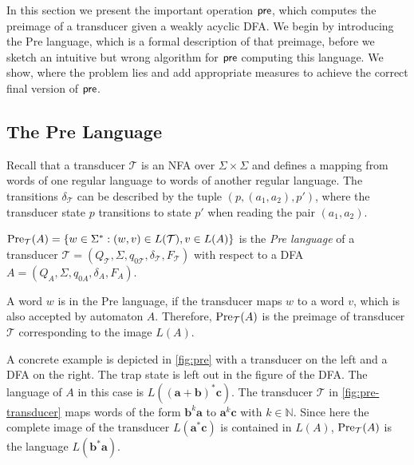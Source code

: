 In this section we present the important operation $\operatorname{\textsf{pre}}$, which computes the preimage of a transducer given a weakly acyclic DFA. We begin by introducing the Pre language, which is a formal description of that preimage, before we sketch an intuitive but wrong algorithm for $\operatorname{\textsf{pre}}$ computing this language. We show, where the problem lies and add appropriate measures to achieve the correct final version of $\operatorname{\textsf{pre}}$.

\subsection{The Pre Language}\label{sec:pre_theory}
Recall that a transducer $\mathcal{T}$ is an NFA over $\Sigma \times \Sigma$ and defines a mapping from words of one regular language to words of another regular language. The transitions $\delta_{\mathcal{T}}$ can be described by the tuple $(p,(a_{1},a_{2}),p')$, where the transducer state $p$ transitions to state $p'$ when reading the pair $(a_{1},a_{2})$.

\begin{definition}\label{def:pre}
$\operatorname{\text{Pre}}_{\mathcal{T}}(A) = \{ w \in \Sigma^{*}: (w,v) \in L(\mathcal{T}), v \in L(A) \}$
is the \emph{Pre language} of a transducer $\mathcal{T} = (Q_{\mathcal{T}},\Sigma,q_{0\mathcal{T}},\delta_{\mathcal{T}},F_{\mathcal{T}})$ with respect to a DFA $A = (Q_{A},\Sigma,q_{0A}, \delta_{A}, F_{A})$. 
\end{definition}

A word $w$ is in the Pre language, if the transducer maps $w$ to a word $v$, which is also accepted by automaton $A$.
Therefore, $\operatorname{\text{Pre}}_{\mathcal{T}}(A)$ is the preimage of transducer $\mathcal{T}$ corresponding to the image $L(A)$. 

\par

A concrete example is depicted in \autoref{fig:pre} with a transducer on the left and a DFA on the right. The trap state is left out in the figure of the DFA. The language of $A$ in this case is $L(\bm{(a+b)^{*}c})$. The transducer $\mathcal{T}$ in \autoref{fig:pre-transducer} maps words of the form $\bm{b}^{k}\bm{a}$ to $\bm{a}^{k}\bm{c}$ with $k \in \mathbb{N}$. 
Since here the complete image of the transducer $L(\bm{a^{*}c})$ is contained in $L(A)$, $\operatorname{\text{Pre}}_{\mathcal{T}}(A)$ is the language $L(\bm{b^{*}a})$. 


